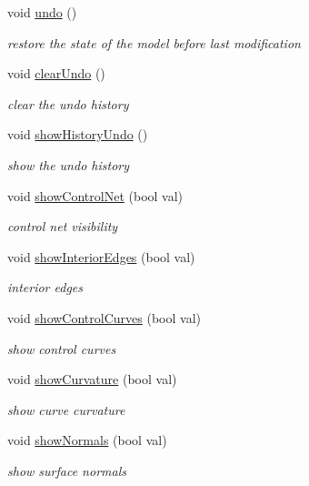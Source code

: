 \begin{DoxyCompactItemize}
void \hyperlink{classShipCAD_1_1Controller_a52b8812ceca0b4368dea2e2b4399d860}{undo} ()
\begin{DoxyCompactList}\small\item\em restore the state of the model before last modification \end{DoxyCompactList}\item 
void \hyperlink{classShipCAD_1_1Controller_ad9c16d37e77b98b2f289839d4f337325}{clear\-Undo} ()
\begin{DoxyCompactList}\small\item\em clear the undo history \end{DoxyCompactList}\item 
void \hyperlink{classShipCAD_1_1Controller_a32103fdef0de00b63eba1ef4282c5598}{show\-History\-Undo} ()
\begin{DoxyCompactList}\small\item\em show the undo history \end{DoxyCompactList}\item 
void \hyperlink{classShipCAD_1_1Controller_a81d04dc566ba580aa225c5369767220f}{show\-Control\-Net} (bool val)
\begin{DoxyCompactList}\small\item\em control net visibility \end{DoxyCompactList}\item 
void \hyperlink{classShipCAD_1_1Controller_a3f722582d47e27a34deb467156056f3b}{show\-Interior\-Edges} (bool val)
\begin{DoxyCompactList}\small\item\em interior edges \end{DoxyCompactList}\item 
void \hyperlink{classShipCAD_1_1Controller_a2c3339b26ab0856a66720e370523d80c}{show\-Control\-Curves} (bool val)
\begin{DoxyCompactList}\small\item\em show control curves \end{DoxyCompactList}\item 
void \hyperlink{classShipCAD_1_1Controller_a9ba96a9070361816f926d8b0d2becd38}{show\-Curvature} (bool val)
\begin{DoxyCompactList}\small\item\em show curve curvature \end{DoxyCompactList}\item 
void \hyperlink{classShipCAD_1_1Controller_adb1d1402849db292b29ec78ba89639d9}{show\-Normals} (bool val)
\begin{DoxyCompactList}\small\item\em show surface normals \end{DoxyCompactList}\item 

\end{DoxyCompactItemize}
